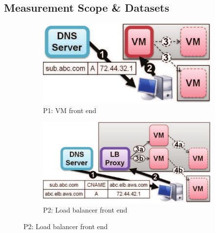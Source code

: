 \subsection{Measurement Scope \& Datasets}
\label{cloud-measure-background}


\begin{figure}[t]
\centering
\begin{subfigure}[b]{0.20\textwidth}
    \includegraphics[width=\textwidth]{figures/cloudmeasure/imag_sec2/ec2_vm.pdf}
    \caption{P1: VM front end}
    \label{fig:ec2_vm}
\end{subfigure}
\hspace{0.03\columnwidth}
\begin{subfigure}[b]{0.3\textwidth}
    \includegraphics[width=\textwidth]{figures/cloudmeasure/imag_sec2/ec2_elb.pdf}
    \caption{P2: Load balancer front end}
    \label{fig:ec2_elb}
\end{subfigure}


\end{figure}

